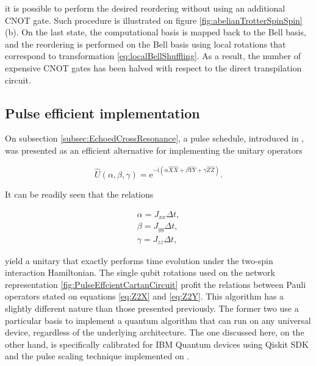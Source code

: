        \noindent it is possible to perform the desired reordering without using an additional CNOT gate. Such procedure is illustrated on figure \ref{fig:abelianTrotterSpinSpin}(b). On the last state, the computational basis is mapped back to the Bell basis, and the reordering is performed on the Bell basis using local rotations that correspond to transformation \ref{eq:localBellShuffling}. As a result, the number of expensive CNOT gates has been halved with respect to the direct transpilation circuit.

      

    \subsection{Pulse efficient implementation}
    \label{subsubsec:PulseEfficientCircuit}

      On subsection \ref{subsec:EchoedCrossResonance}, a pulse schedule, introduced in \cite{RXZPulseEfficient}, was presented as an efficient alternative for implementing the unitary operators

      \begin{equation}
        \hat{U}(\alpha, \beta, \gamma) = \mathrm{e}^{-\mathrm{i}(\alpha\hat{X}\hat{X} + \beta\hat{Y}\hat{Y} + \gamma\hat{Z}\hat{Z})}
        \label{eq:CartanDecomp2}.
      \end{equation}

      It can be readily seen that the relations

      \begin{gather}
        \alpha = J_{xx} \Delta t, \\
        \beta = J_{yy} \Delta t, \\
        \gamma = J_{zz} \Delta t,
      \end{gather}

      \noindent yield a unitary that exactly performs time evolution under the two-spin interaction Hamiltonian. The single qubit rotations used on the network representation \ref{fig:PulseEffcientCartanCircuit} profit the relations between Pauli operators stated on equations \ref{eq:Z2X} and \ref{eq:Z2Y}. This algorithm has a slightly different nature than those presented previously. The former two use a particular basis to implement a quantum algorithm that can run on any universal device, regardless of the underlying architecture. The one discussed here, on the other hand, is specifically calibrated for IBM Quantum devices using Qiskit SDK and the pulse scaling technique implemented on \cite{RXZPulseEfficient}.

